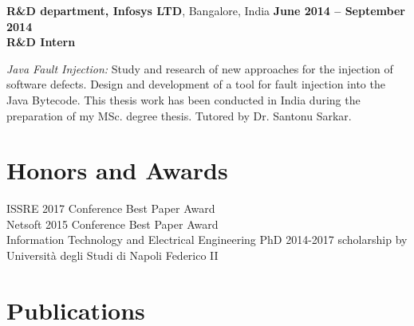 \documentclass[margin,line]{resume}
\begin{document}
\begin{resume}
\filbreak
\textbf{R\&D department, Infosys LTD}, Bangalore, India\hfill
\textbf{June 2014 -- September 2014}\\
\textbf{R\&D Intern}\hfill 
\vspace{-3mm}\\\vspace{-1mm}
\begin{list2}
    \item \filbreak\textit{Java Fault Injection:} Study and research of new approaches for the injection of software defects. Design and development of a tool for fault injection into the Java Bytecode. This thesis work has been conducted in India during the preparation of my MSc. degree thesis. Tutored by Dr. Santonu Sarkar.
\end{list2}

\section{\mysidestyle Honors and Awards}
ISSRE 2017 Conference Best Paper Award
\vspace{1mm}\\%
Netsoft 2015 Conference Best Paper Award
\vspace{1mm}\\%
Information Technology and Electrical Engineering PhD 2014-2017 scholarship by Universit\`a degli Studi di Napoli Federico II

\section{\mysidestyle Publications}


\end{resume}
\end{document}
